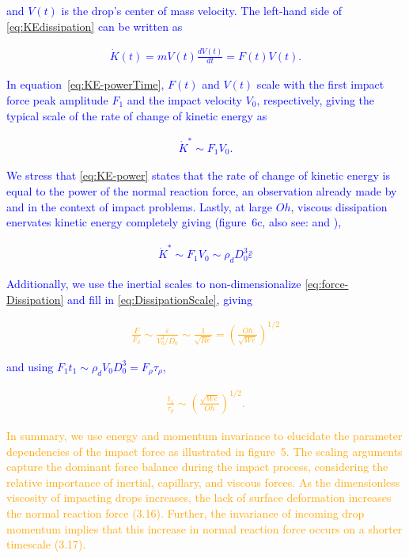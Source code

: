 \documentclass[]{article}
\newcommand*\blue{\textcolor{blue}}
\newcommand{\VS}[1]{{\textcolor{orange}{#1}}}
\begin{document}
\begin{enumerate}
	\noindent \blue{and $V(t)$ is the drop's center of mass velocity. The left-hand side of \eqref{eq:KEdissipation} can be written as}
	
	\blue{\begin{align}\label{eq:KE-powerTime}
		\dot{K}(t) = mV(t)\frac{dV(t)}{dt} = F(t)V(t).
	\end{align}}
	
	\noindent \blue{In equation~\eqref{eq:KE-powerTime}, $F(t)$ and $V(t)$ scale with the first impact force peak amplitude $F_1$ and the impact velocity $V_0$, respectively, giving the typical scale of the rate of change of kinetic energy as}
	
	\blue{\begin{align}\label{eq:KE-power}
		\dot{K}^* \sim F_1V_0.
	\end{align}}
	
	\noindent \blue{We stress that \eqref{eq:KE-power} states that the rate of change of kinetic energy is equal to the power of the normal reaction force, an observation already made by \citet{wagner1932stoss} and \citet{Philippi2016} in the context of impact problems. Lastly, at large $Oh$, viscous dissipation enervates kinetic energy completely giving (figure~6c, also see:  \citet{Philippi2016} and \citet{ Wildeman2016}),}
	
	\blue{\begin{align}\label{eq:force-Dissipation}
		\dot{K}^* \sim F_1V_0 \sim \rho_dD_0^3\bar{\varepsilon}
	\end{align}}
	
	\noindent \blue{Additionally, we use the inertial scales to non-dimensionalize  \eqref{eq:force-Dissipation} and fill in \eqref{eq:DissipationScale}, giving}
	
	\VS{\begin{align}
		\frac{F}{F_\rho} \sim \frac{\bar{\varepsilon}}{V_0^3/D_0} \sim \frac{1}{\sqrt{Re}} = \left(\frac{Oh}{\sqrt{We}}\right)^{1/2}
	\end{align}}
	
	\noindent \blue{and using $F_1t_1 \sim \rho_dV_0D_0^3 = F_\rho\tau_\rho$,}
	
	\VS{\begin{align}
		\frac{t_1}{\tau_\rho} \sim \left(\frac{\sqrt{We}}{Oh}\right)^{1/2}.
	\end{align}}
	
	\VS{In summary, we use energy and momentum invariance to elucidate the parameter dependencies of the impact force as illustrated in figure~5. The scaling arguments capture the dominant force balance during the impact process, considering the relative importance of inertial, capillary, and viscous forces. As the dimensionless viscosity of impacting drops increases, the lack of surface deformation increases the normal reaction force (3.16). Further, the invariance of incoming drop momentum implies that this increase in normal reaction force occurs on a shorter timescale (3.17).}
	

\end{enumerate}
\end{document}

